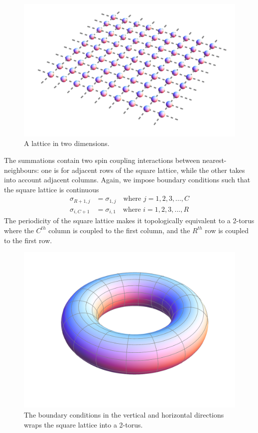 \begin{figure}[htp]
\centering \includegraphics[scale=0.2]{Graphics/TransferMatrix/lattice_2d.png}
\caption{A lattice in two dimensions.}
\label{fig:2dlattice} 
\end{figure}
%
The summations contain two spin coupling interactions between nearest-neighbours: one is for adjacent rows of the square lattice, while the other takes into account adjacent columns. Again, we impose boundary conditions such that the square lattice is continuous
%
\begin{align}
\label{2disingboundarycondition1}
\sigma_{R+1,j}&=\sigma_{1,j}\quad \text{where $j=1,2,3,...,C$}\\
\label{2disingboundarycondition2}
\sigma_{i,C+1}&=\sigma_{i,1}\quad \text{where $i=1,2,3,...,R$}
\end{align}
%
The periodicity of the square lattice makes it topologically equivalent to a 2-torus where the $C^{th}$ column is coupled to the first column, and the  $R^{th}$ row is coupled to the first row. 
%
\begin{figure}[htp]
\centering \includegraphics[scale=0.25]{Graphics/TransferMatrix/torus.png}
\caption{The boundary conditions in the vertical and horizontal directions wraps the square lattice into a 2-torus.}
\label{fig:torus} 
\end{figure}
